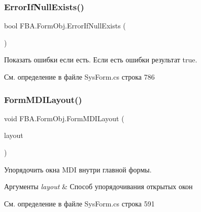\mbox{\label{class_f_b_a_1_1_form_obj_a86ea9bb8599b17b13d42df644a2aaa32}} 
\subsubsection{\texorpdfstring{Error\+If\+Null\+Exists()}{ErrorIfNullExists()}}
{\footnotesize\ttfamily bool F\+B\+A.\+Form\+Obj.\+Error\+If\+Null\+Exists (\begin{DoxyParamCaption}{ }\end{DoxyParamCaption})}



Показать ошибки если есть. Если есть ошибки результат true. 



См. определение в файле Sys\+Form.\+cs строка 786

\mbox{\label{class_f_b_a_1_1_form_obj_ae1274b7643c0d9c1be6d4ad19e0382f9}} 
\subsubsection{\texorpdfstring{Form\+M\+D\+I\+Layout()}{FormMDILayout()}}
{\footnotesize\ttfamily void F\+B\+A.\+Form\+Obj.\+Form\+M\+D\+I\+Layout (\begin{DoxyParamCaption}\item[{System.\+Windows.\+Forms.\+Mdi\+Layout}]{layout }\end{DoxyParamCaption})}



Упорядочить окна M\+DI внутри главной формы. 


\begin{DoxyParams}{Аргументы}
{\em layout} & Способ упорядочивания открытых окон\\
\hline
\end{DoxyParams}


См. определение в файле Sys\+Form.\+cs строка 591

\mbox{\label{class_f_b_a_1_1_form_obj_a3e74ea199f5a4e12b79efd06135e3118}} 

